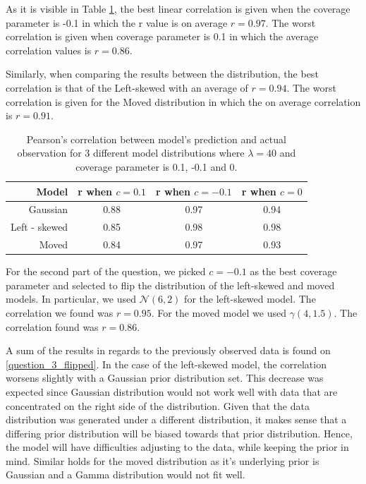 \documentclass[11pt,a4paper,oneside]{article}
\begin{document}
As it is visible in Table \ref{question_3}, the best linear correlation is given when the coverage parameter is -0.1 in which the r value is on average $r = 0.97$. The worst correlation is given when coverage parameter is 0.1 in which the average correlation values is $r = 0.86$.

Similarly, when comparing the results between the distribution, the best correlation is that of the Left-skewed with an average of $r = 0.94$. The worst correlation is given for the Moved distribution in which the on average correlation is $r = 0.91$.

\begin{table}[ht]
\centering
\begin{tabular}{rccc}
  \hline
 Model & r when $c = 0.1$ & r when $c = -0.1$ & r when $c = 0$ \\ 
  \hline
    Gaussian & 0.88 & 0.97 & 0.94\\ 
    Left - skewed & 0.85 & 0.98 & 0.98\\ 
    Moved & 0.84 & 0.97 & 0.93\\ 
   \hline
\end{tabular}
\caption{Pearson's correlation between model's prediction and actual observation for 3 different model distributions where $\lambda = 40$ and coverage parameter is 0.1, -0.1 and 0.}
\label{question_3}
\end{table}

For the second part of the question, we picked $c = -0.1$ as the best coverage parameter and selected to flip the distribution of the left-skewed and moved models. In particular, we used $\mathcal{N}(6, 2)$ for the left-skewed model. The correlation we found was $r = 0.95$. For the moved model we used $\mathcal{\gamma}(4, 1.5)$. The correlation found was $r = 0.86$.

A sum of the results in regards to the previously observed data is found on  \autoref{question_3_flipped}. In the case of the left-skewed model, the correlation worsens slightly with a Gaussian prior distribution set. This decrease was expected since Gaussian distribution would not work well with data that are concentrated on the right side of the distribution. Given that the data distribution was generated under a different distribution, it makes sense that a differing prior distribution will be biased towards that prior distribution. Hence, the model will have difficulties adjusting to the data, while keeping the prior in mind. Similar holds for the moved distribution as it's underlying prior is Gaussian and a Gamma distribution would not fit well.
\end{document}
